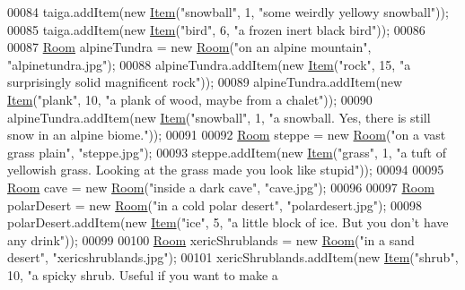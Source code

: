 \begin{DoxyCode}
00084         taiga.addItem(\textcolor{keyword}{new} \hyperlink{classItem}{Item}(\textcolor{stringliteral}{"snowball"}, 1, \textcolor{stringliteral}{"some weirdly yellowy snowball"}));
00085         taiga.addItem(\textcolor{keyword}{new} \hyperlink{classItem}{Item}(\textcolor{stringliteral}{"bird"}, 6, \textcolor{stringliteral}{"a frozen inert black bird"}));
00086 
00087         \hyperlink{classRoom}{Room} alpineTundra = \textcolor{keyword}{new} \hyperlink{classRoom}{Room}(\textcolor{stringliteral}{"on an alpine mountain"}, \textcolor{stringliteral}{"alpinetundra.jpg"});
00088         alpineTundra.addItem(\textcolor{keyword}{new} \hyperlink{classItem}{Item}(\textcolor{stringliteral}{"rock"}, 15, \textcolor{stringliteral}{"a surprisingly solid magnificent rock"}));
00089         alpineTundra.addItem(\textcolor{keyword}{new} \hyperlink{classItem}{Item}(\textcolor{stringliteral}{"plank"}, 10, \textcolor{stringliteral}{"a plank of wood, maybe from a chalet"}));
00090         alpineTundra.addItem(\textcolor{keyword}{new} \hyperlink{classItem}{Item}(\textcolor{stringliteral}{"snowball"}, 1, \textcolor{stringliteral}{"a snowball. Yes, there is still snow in an alpine
       biome."}));
00091 
00092         \hyperlink{classRoom}{Room} steppe = \textcolor{keyword}{new} \hyperlink{classRoom}{Room}(\textcolor{stringliteral}{"on a vast grass plain"}, \textcolor{stringliteral}{"steppe.jpg"});
00093         steppe.addItem(\textcolor{keyword}{new} \hyperlink{classItem}{Item}(\textcolor{stringliteral}{"grass"}, 1, \textcolor{stringliteral}{"a tuft of yellowish grass. Looking at the grass made you
       look like stupid"}));
00094 
00095         \hyperlink{classRoom}{Room} cave = \textcolor{keyword}{new} \hyperlink{classRoom}{Room}(\textcolor{stringliteral}{"inside a dark cave"}, \textcolor{stringliteral}{"cave.jpg"});
00096 
00097         \hyperlink{classRoom}{Room} polarDesert = \textcolor{keyword}{new} \hyperlink{classRoom}{Room}(\textcolor{stringliteral}{"in a cold polar desert"}, \textcolor{stringliteral}{"polardesert.jpg"});
00098         polarDesert.addItem(\textcolor{keyword}{new} \hyperlink{classItem}{Item}(\textcolor{stringliteral}{"ice"}, 5, \textcolor{stringliteral}{"a little block of ice. But you don't have any drink"}));
00099 
00100         \hyperlink{classRoom}{Room} xericShrublands = \textcolor{keyword}{new} \hyperlink{classRoom}{Room}(\textcolor{stringliteral}{"in a sand desert"}, \textcolor{stringliteral}{"xericshrublands.jpg"});
00101         xericShrublands.addItem(\textcolor{keyword}{new} \hyperlink{classItem}{Item}(\textcolor{stringliteral}{"shrub"}, 10, \textcolor{stringliteral}{"a spicky shrub. Useful if you want to make a
}
\end{DoxyCode}
